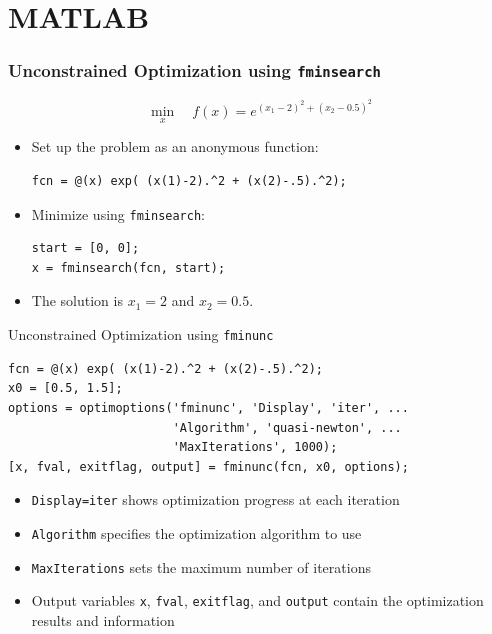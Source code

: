 \documentclass{beamer}
\begin{document}
\section{MATLAB}

\begin{frame}[fragile]
\frametitle{Unconstrained Optimization using \texttt{fminsearch}}
$$
\min_{x} \quad f(x) = e^{(x_1-2)^2 + (x_2-0.5)^2}
$$
\begin{itemize}
\item Set up the problem as an anonymous function:
\begin{lstlisting}[style=MATLAB]
% Define the objective function
fcn = @(x) exp( (x(1)-2).^2 + (x(2)-.5).^2);
\end{lstlisting}
\item Minimize using \verb|fminsearch|:
\begin{lstlisting}[style=MATLAB]
% Solve the optimization problem
start = [0, 0];
x = fminsearch(fcn, start);
\end{lstlisting}
\item The solution is $x_1 = 2$ and $x_2 = 0.5$.
\end{itemize}
\end{frame}


\begin{frame}[fragile]{Unconstrained Optimization using \texttt{fminunc}}

        \begin{lstlisting}[style=Matlab]
fcn = @(x) exp( (x(1)-2).^2 + (x(2)-.5).^2);
x0 = [0.5, 1.5];
options = optimoptions('fminunc', 'Display', 'iter', ...
                       'Algorithm', 'quasi-newton', ...
                       'MaxIterations', 1000);
[x, fval, exitflag, output] = fminunc(fcn, x0, options);
        \end{lstlisting}
 
    \begin{itemize}
        \item \texttt{Display=iter} shows optimization progress at each iteration
        \item \texttt{Algorithm} specifies the optimization algorithm to use
        \item \texttt{MaxIterations} sets the maximum number of iterations
        \item Output variables \texttt{x}, \texttt{fval}, \texttt{exitflag}, and \texttt{output} contain the optimization results and information
    \end{itemize}

\end{frame}
\end{document}
